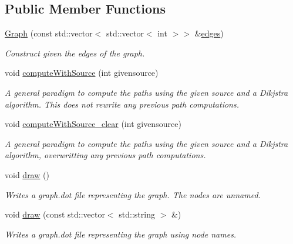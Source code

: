\subsection*{Public Member Functions}
\begin{DoxyCompactItemize}
\item 
\hyperlink{classMackey_1_1Graph_a4f0ca7cec28645835bbad29b8c00992c}{Graph} (const std\+::vector$<$ std\+::vector$<$ int $>$$>$ \&\hyperlink{classMackey_1_1Graph_a0a2aeb9b16c5f0e583f360943b7f340f}{edges})
\begin{DoxyCompactList}\small\item\em Construct given the edges of the graph. \end{DoxyCompactList}\item 
void \hyperlink{classMackey_1_1Graph_acda32cd8d144dcd1ec771bd8d2753321}{compute\+With\+Source} (int givensource)
\begin{DoxyCompactList}\small\item\em A general paradigm to compute the paths using the given source and a Dikjstra algorithm. This does not rewrite any previous path computations. \end{DoxyCompactList}\item 
void \hyperlink{classMackey_1_1Graph_a769966fd9422efb15a53db185a8be278}{compute\+With\+Source\+\_\+clear} (int givensource)
\begin{DoxyCompactList}\small\item\em A general paradigm to compute the paths using the given source and a Dikjstra algorithm, overwritting any previous path computations. \end{DoxyCompactList}\item 
void \hyperlink{classMackey_1_1Graph_ab88d38f2fa1822d415ce7dac272b32dc}{draw} ()
\begin{DoxyCompactList}\small\item\em Writes a graph.\+dot file representing the graph. The nodes are unnamed. \end{DoxyCompactList}\item 
void \hyperlink{classMackey_1_1Graph_a63aa485ca7838f3dc66da1749e09cd84}{draw} (const std\+::vector$<$ std\+::string $>$ \&)
\begin{DoxyCompactList}\small\item\em Writes a graph.\+dot file representing the graph using node names. \end{DoxyCompactList}\end{DoxyCompactItemize}
